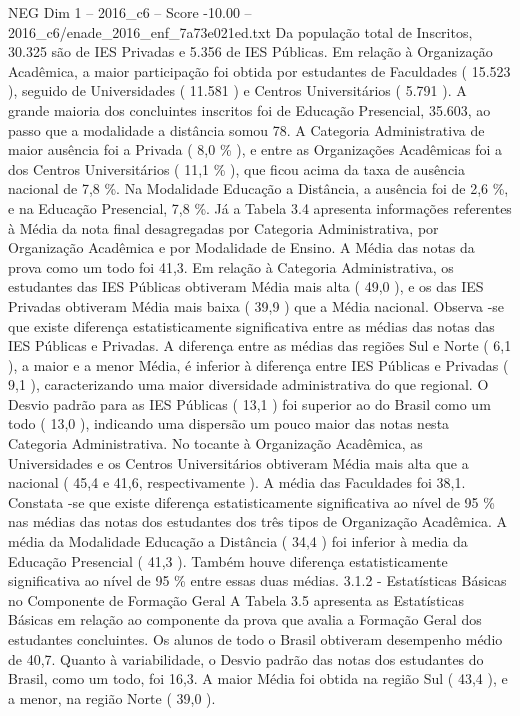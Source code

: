 \begin{textsample}{NEG Dim 1 – 2016\_c6 – Score -10.00 – 2016\_c6/enade\_2016\_enf\_7a73e021ed.txt}
Da população total de Inscritos, 30.325 são de IES Privadas e 5.356 de IES Públicas.
Em relação à Organização Acadêmica, a maior participação foi obtida por estudantes de Faculdades ( 15.523 ), seguido de Universidades ( 11.581 ) e Centros Universitários ( 5.791 ).
A grande maioria dos concluintes inscritos foi de Educação Presencial, 35.603, ao passo que a modalidade a distância somou 78.
A Categoria Administrativa de maior ausência foi a Privada ( 8,0 \% ), e entre as Organizações Acadêmicas foi a dos Centros Universitários ( 11,1 \% ), que ficou acima da taxa de ausência nacional de 7,8 \%.
Na Modalidade Educação a Distância, a ausência foi de 2,6 \%, e na Educação Presencial, 7,8 \%.
Já a Tabela 3.4 apresenta informações referentes à Média da nota final desagregadas por Categoria Administrativa, por Organização Acadêmica e por Modalidade de Ensino.
A Média das notas da prova como um todo foi 41,3.
Em relação à Categoria Administrativa, os estudantes das IES Públicas obtiveram Média mais alta ( 49,0 ), e os das IES Privadas obtiveram Média mais baixa ( 39,9 ) que a Média nacional.
Observa -se que existe diferença estatisticamente significativa entre as médias das notas das IES Públicas e Privadas.
A diferença entre as médias das regiões Sul e Norte ( 6,1 ), a maior e a menor Média, é inferior à diferença entre IES Públicas e Privadas ( 9,1 ), caracterizando uma maior diversidade administrativa do que regional.
O Desvio padrão para as IES Públicas ( 13,1 ) foi superior ao do Brasil como um todo ( 13,0 ), indicando uma dispersão um pouco maior das notas nesta Categoria Administrativa.
No tocante à Organização Acadêmica, as Universidades e os Centros Universitários obtiveram Média mais alta que a nacional ( 45,4 e 41,6, respectivamente ).
A média das Faculdades foi 38,1.
Constata -se que existe diferença estatisticamente significativa ao nível de 95 \% nas médias das notas dos estudantes dos três tipos de Organização Acadêmica.
A média da Modalidade Educação a Distância ( 34,4 ) foi inferior à media da Educação Presencial ( 41,3 ).
Também houve diferença estatisticamente significativa ao nível de 95 \% entre essas duas médias. 3.1.2 - Estatísticas Básicas no Componente de Formação Geral A Tabela 3.5 apresenta as Estatísticas Básicas em relação ao componente da prova que avalia a Formação Geral dos estudantes concluintes.
Os alunos de todo o Brasil obtiveram desempenho médio de 40,7.
Quanto à variabilidade, o Desvio padrão das notas dos estudantes do Brasil, como um todo, foi 16,3.
A maior Média foi obtida na região Sul ( 43,4 ), e a menor, na região Norte ( 39,0 ).

\end{textsample}
